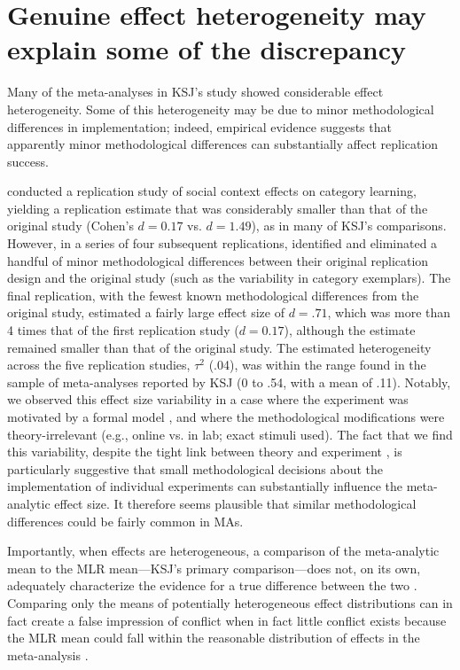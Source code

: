 \documentclass[man,floatsintext]{apa7}
\begin{document}
\section{Genuine effect heterogeneity may explain some of the discrepancy}


Many of the meta-analyses in KSJ’s study showed considerable effect heterogeneity. Some of this heterogeneity may be due to minor methodological differences in implementation; indeed, empirical evidence suggests that apparently minor methodological differences can substantially affect replication success. 

\Textcite{lewis2016understanding} conducted a replication study of social context effects on category learning, yielding a replication estimate that was considerably smaller than that of the original study (Cohen's $d=0.17$ vs. $d=1.49$), as in many of KSJ's comparisons. However, in a series of four subsequent replications, \Textcite{lewis2016understanding} identified and eliminated a handful of minor methodological differences between their original replication design and the original study (such as the variability in category exemplars). The final replication, with the fewest known methodological differences from the original study, estimated a fairly large effect size of $d=.71$, which was more than 4 times that of the first replication study ($d=0.17$), although the estimate remained smaller than that of the original study. The estimated heterogeneity across the five replication studies,  $\tau^{2}$ (.04), was within the range found in the sample of meta-analyses reported by KSJ (0 to .54, with a mean of .11). Notably, we observed this effect size variability in a case where the experiment was motivated by a formal model \parencite{xu2007word}, and where the methodological modifications were theory-irrelevant (e.g., online vs. in lab; exact stimuli used). The fact that we find this variability, despite the tight link between theory and experiment \parencite{oberauer2019addressing}, is particularly suggestive that small methodological decisions about the implementation of individual experiments can substantially influence the meta-analytic effect size. It therefore seems plausible that similar methodological differences could be fairly common in MAs. 

Importantly, when effects are heterogeneous, a comparison of the meta-analytic mean to the MLR mean---KSJ’s primary comparison---does not, on its own, adequately characterize the evidence for a true difference between the two \parencite{mathur2019new}. Comparing only the means of potentially heterogeneous effect distributions can in fact create a false impression of conflict when in fact little conflict exists because the MLR mean could fall within the reasonable distribution of effects in the meta-analysis \parencite{mathur2019new, mathur2019finding}. 
\end{document}
